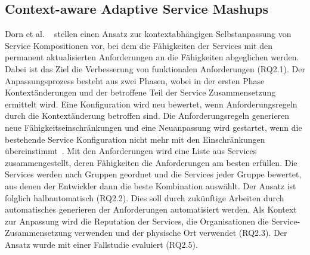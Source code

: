 \documentclass[conference,compsoc]{IEEEtran}
\begin{document}
\subsection{Context-aware Adaptive Service Mashups}
Dorn et al. ~\cite{dorn2009context} stellen einen Ansatz zur kontextabhängigen Selbstanpassung von Service Kompositionen vor, bei dem die Fähigkeiten der Services mit den permanent aktualisierten Anforderungen an die Fähigkeiten abgeglichen werden. Dabei ist das Ziel die Verbesserung von funktionalen Anforderungen (RQ2.1). Der Anpassungsprozess besteht aus zwei Phasen, wobei in der ersten Phase Kontextänderungen und der betroffene Teil der Service Zusammensetzung ermittelt wird. Eine Konfiguration wird neu bewertet, wenn Anforderungsregeln durch die Kontextänderung betroffen sind. Die Anforderungsregeln generieren neue Fähigkeitseinschränkungen und eine Neuanpassung wird gestartet, wenn die bestehende Service Konfiguration nicht mehr mit den Einschränkungen übereinstimmt~\cite{dorn2009context}. Mit den Anforderungen wird eine Liste aus Services zusammengestellt, deren Fähigkeiten die Anforderungen am besten erfüllen. Die Services werden nach Gruppen geordnet und die Services jeder Gruppe bewertet, aus denen der Entwickler dann die beste Kombination auswählt. Der Ansatz ist folglich halbautomatisch (RQ2.2). Dies soll durch zukünftige Arbeiten durch automatisches generieren der Anforderungen automatisiert werden.
Als Kontext zur Anpassung wird die Reputation der Services, die Organisationen die Service-Zusammensetzung verwenden und der physische Ort verwendet (RQ2.3).
Der Ansatz wurde mit einer Fallstudie evaluiert (RQ2.5).
\end{document}
